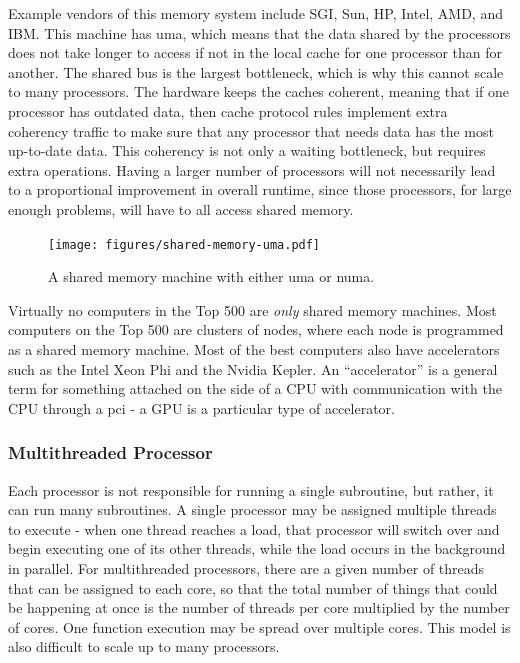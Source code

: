 \documentclass[10pt]{article}
\begin{document}
\begin{flushleft}
Example vendors of this memory system include SGI, Sun, HP, Intel, AMD, and IBM. This machine has \gls{uma}, which means that the data shared by the processors does not take longer to access if not in the local cache for one processor than for another. The shared bus is the largest bottleneck, which is why this cannot scale to many processors. The hardware keeps the caches coherent, meaning that if one processor has outdated data, then cache protocol rules implement extra coherency traffic to make sure that any processor that needs data has the most up-to-date data. This coherency is not only a waiting bottleneck, but requires extra operations. Having a larger number of processors will not necessarily lead to a proportional improvement in overall runtime, since those processors, for large enough problems, will have to all access shared memory.

\begin{figure}[H]
\centering
\texttt{[image: figures/shared-memory-uma.pdf]}
\caption{A shared memory machine with either \gls{uma} or \gls{numa}.}
\end{figure}

Virtually no computers in the Top 500 are \textit{only} shared memory machines. Most computers on the Top 500 are clusters of nodes, where each node is programmed as a shared memory machine. Most of the best computers also have accelerators such as the Intel Xeon Phi and the Nvidia Kepler. An ``accelerator'' is a general term for something attached on the side of a CPU with communication with the CPU through a \gls{pci} - a GPU is a particular type of accelerator.

\subsubsection{Multithreaded Processor}

Each processor is not responsible for running a single subroutine, but rather, it can run many subroutines. A single processor may be assigned multiple threads to execute - when one thread reaches a load, that processor will switch over and begin executing one of its other threads, while the load occurs in the background in parallel. For multithreaded processors, there are a given number of threads that can be assigned to each core, so that the total number of things that could be happening at once is the number of threads per core multiplied by the number of cores. One function execution may be spread over multiple cores. This model is also difficult to scale up to many processors.


\end{flushleft}
\end{document}
